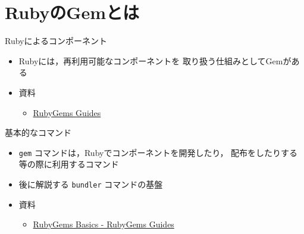 \documentclass[t, aspectratio=169]{beamer}
\begin{document}
\section{RubyのGemとは}
\label{sec-1-4}
\begin{frame}[label=sec-1-4-1]{Rubyによるコンポーネント}
\begin{itemize}
\item Rubyには，再利用可能なコンポーネントを
取り扱う仕組みとしてGemがある
\item 資料
\begin{itemize}
\item \href{http://guides.rubygems.org/}{RubyGems Guides}
\end{itemize}
\end{itemize}
\end{frame}
\begin{frame}[fragile,label=sec-1-4-2]{基本的なコマンド}
 \begin{itemize}
\item \texttt{gem} コマンドは，Rubyでコンポーネントを開発したり，
配布をしたりする等の際に利用するコマンド
\item 後に解説する \texttt{bundler} コマンドの基盤
\item 資料
\begin{itemize}
\item \href{http://guides.rubygems.org/rubygems-basics/}{RubyGems Basics - RubyGems Guides}
\end{itemize}
\end{itemize}
\end{frame}
\end{document}
